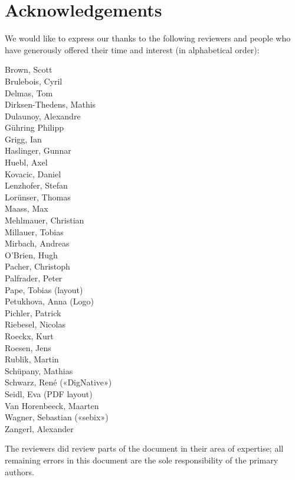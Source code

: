 \clearpage
\section*{Acknowledgements}
\label{section:Reviewers}

We would like to express our thanks to the following reviewers and people who have generously offered their time and interest (in alphabetical order):

\begin{multicols}{2}{\parskip=0pt\centering\obeylines%
Brown, Scott \\
Brulebois, Cyril \\
Delmas, Tom \\
Dirksen-Thedens, Mathis \\
Dulaunoy, Alexandre \\
Gühring Philipp  \\
Grigg, Ian  \\
Haslinger, Gunnar \\
Huebl, Axel \\
Kovacic, Daniel \\
Lenzhofer, Stefan \\
Lorünser, Thomas \\
Maass, Max \\
Mehlmauer, Christian \\
Millauer, Tobias \\
Mirbach, Andreas \\
O'Brien, Hugh \\
Pacher, Christoph \\
Palfrader, Peter \\
Pape, Tobias (layout) \\
Petukhova, Anna (Logo) \\
Pichler, Patrick \\
Riebesel, Nicolas \\
Roeckx, Kurt \\
Roesen, Jens \\
Rublik, Martin \\
Schüpany, Mathias \\
Schwarz, René («DigNative») \\
Seidl, Eva (PDF layout) \\
Van Horenbeeck, Maarten \\
Wagner, Sebastian («sebix») \\
Zangerl, Alexander \\
}\end{multicols}





The reviewers did review parts of the document in their area of
expertise; all remaining errors in this document are the sole
responsibility of the primary authors.




